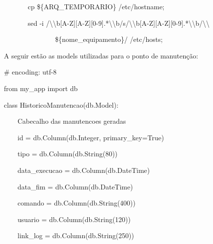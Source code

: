 {\ttfamily\color[rgb]{0.10980392,0.10980392,0.10980392}
    \ \ \ \ \ \ \ cp \$\{ARQ\_TEMPORARIO\} /etc/hostname;}

{\ttfamily\color[rgb]{0.10980392,0.10980392,0.10980392}
    \ \ \ \ \ \ \ sed -i
    {\textquotedbl}/{\textbackslash}{\textbackslash}b[A-Z][A-Z][0-9].*{\textbackslash}{\textbackslash}b/s/{\textbackslash}{\textbackslash}b[A-Z][A-Z][0-9].*{\textbackslash}{\textbackslash}b/{\textbackslash}{\textbackslash}}

{\ttfamily\color[rgb]{0.10980392,0.10980392,0.10980392}
    \ \ \ \ \ \ \ \ \ \ \ \ \ \ \ \$\{nome\_equipamento\}/{\textquotedbl}
    /etc/hosts;{\textquotedbl}{\textquotedbl}{\textquotedbl}}

{\color{black}
    A seguir est\~ao as models utilizadas para o ponto de manuten\c{c}\~ao:}

{\ttfamily\color[rgb]{0.10980392,0.10980392,0.10980392}
    \# encoding: utf-8}

{\ttfamily\color[rgb]{0.10980392,0.10980392,0.10980392}
    from my\_app import db}


    \bigskip


    \bigskip

{\ttfamily\color[rgb]{0.10980392,0.10980392,0.10980392}
    class HistoricoManutencao(db.Model):}

{\ttfamily\color[rgb]{0.10980392,0.10980392,0.10980392}
    \ \ \ \ {\textquotedbl}{\textquotedbl}{\textquotedbl}Cabecalho das manutencoes
        geradas{\textquotedbl}{\textquotedbl}{\textquotedbl}}

{\ttfamily\color[rgb]{0.10980392,0.10980392,0.10980392}
    \ \ \ \ id = db.Column(db.Integer, primary\_key=True)}

{\ttfamily\color[rgb]{0.10980392,0.10980392,0.10980392}
    \ \ \ \ tipo = db.Column(db.String(80))}

{\ttfamily\color[rgb]{0.10980392,0.10980392,0.10980392}
    \ \ \ \ data\_execucao = db.Column(db.DateTime)}

{\ttfamily\color[rgb]{0.10980392,0.10980392,0.10980392}
    \ \ \ \ data\_fim = db.Column(db.DateTime)}

{\ttfamily\color[rgb]{0.10980392,0.10980392,0.10980392}
    \ \ \ \ comando = db.Column(db.String(400))}

{\ttfamily\color[rgb]{0.10980392,0.10980392,0.10980392}
    \ \ \ \ usuario = db.Column(db.String(120))}

{\ttfamily\color[rgb]{0.10980392,0.10980392,0.10980392}
    \ \ \ \ link\_log = db.Column(db.String(250))}


